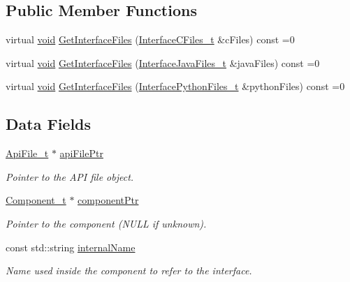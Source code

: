 \subsection*{Public Member Functions}
\begin{DoxyCompactItemize}
\item 
virtual \hyperlink{_t_e_m_p_l_a_t_e__cdef_8h_ac9c84fa68bbad002983e35ce3663c686}{void} \hyperlink{structmodel_1_1_api_ref__t_aecc4d93e7a83042998e3a16854980847}{Get\+Interface\+Files} (\hyperlink{structmodel_1_1_interface_c_files__t}{Interface\+C\+Files\+\_\+t} \&c\+Files) const =0
\item 
virtual \hyperlink{_t_e_m_p_l_a_t_e__cdef_8h_ac9c84fa68bbad002983e35ce3663c686}{void} \hyperlink{structmodel_1_1_api_ref__t_aea1113fc36f5c09e628238eaed6f7627}{Get\+Interface\+Files} (\hyperlink{structmodel_1_1_interface_java_files__t}{Interface\+Java\+Files\+\_\+t} \&java\+Files) const =0
\item 
virtual \hyperlink{_t_e_m_p_l_a_t_e__cdef_8h_ac9c84fa68bbad002983e35ce3663c686}{void} \hyperlink{structmodel_1_1_api_ref__t_ab5fe6d59f36125d257ec0931357038af}{Get\+Interface\+Files} (\hyperlink{structmodel_1_1_interface_python_files__t}{Interface\+Python\+Files\+\_\+t} \&python\+Files) const =0
\end{DoxyCompactItemize}
\subsection*{Data Fields}
\begin{DoxyCompactItemize}
\item 
\hyperlink{structmodel_1_1_api_file__t}{Api\+File\+\_\+t} $\ast$ \hyperlink{structmodel_1_1_api_ref__t_afd035670d53ea2083031b46e0f204295}{api\+File\+Ptr}
\begin{DoxyCompactList}\small\item\em Pointer to the A\+PI file object. \end{DoxyCompactList}\item 
\hyperlink{structmodel_1_1_component__t}{Component\+\_\+t} $\ast$ \hyperlink{structmodel_1_1_api_ref__t_a997ab1c73412c93649b9f41a04c28440}{component\+Ptr}
\begin{DoxyCompactList}\small\item\em Pointer to the component (N\+U\+LL if unknown). \end{DoxyCompactList}\item 
const std\+::string \hyperlink{structmodel_1_1_api_ref__t_a766cd20fe8143a20495c7a7efb9bc4c9}{internal\+Name}
\begin{DoxyCompactList}\small\item\em Name used inside the component to refer to the interface. \end{DoxyCompactList}\end{DoxyCompactItemize}
